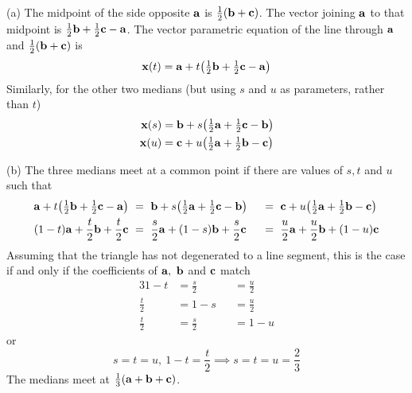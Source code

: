 \begin{solution}
(a) The midpoint of the side opposite $\mathbf{a}$ is
$\tfrac{1}{2}(\mathbf{b}+\mathbf{c})$. The vector joining $\mathbf{a}$ to that midpoint
is $\tfrac{1}{2}\mathbf{b}+\tfrac{1}{2}\mathbf{c}-\mathbf{a}$. The vector parametric equation
of the line through $\mathbf{a}$ and $\tfrac{1}{2}(\mathbf{b}+\mathbf{c})$ is
\begin{equation*}
\mathbf{x}(t)=\mathbf{a}+t\big(\tfrac{1}{2}\mathbf{b}+\tfrac{1}{2}\mathbf{c}-\mathbf{a}\big)
\end{equation*}
Similarly, for the other two medians (but using $s$ and $u$ as
parameters, rather than $t$)
\begin{align*}
\mathbf{x}(s)&=\mathbf{b}+s\big(\tfrac{1}{2}\mathbf{a}+\tfrac{1}{2}\mathbf{c}-\mathbf{b}\big)\\
\mathbf{x}(u)&=\mathbf{c}+u\big(\tfrac{1}{2}\mathbf{a}+\tfrac{1}{2}\mathbf{b}-\mathbf{c}\big)
\end{align*}

(b) The three medians meet at a common point if there are
values of $s,t$ and $u$ such that
\begin{alignat*}{3}
\mathbf{a}+t\big(\tfrac{1}{2}\mathbf{b}+\tfrac{1}{2}\mathbf{c}-\mathbf{a}\big)
&\ =\ \mathbf{b}+s\big(\tfrac{1}{2}\mathbf{a}+\tfrac{1}{2}\mathbf{c}-\mathbf{b}\big)
&&\ =\ \mathbf{c}+u\big(\tfrac{1}{2}\mathbf{a}+\tfrac{1}{2}\mathbf{b}-\mathbf{c}\big)\\
(1-t)\mathbf{a}+\frac{t}{2}\mathbf{b}+\frac{t}{2}\mathbf{c}
&\ =\ \frac{s}{2}\mathbf{a}+(1-s)\mathbf{b}+\frac{s}{2}\mathbf{c}
&&\ =\ \frac{u}{2}\mathbf{a}+\frac{u}{2}\mathbf{b}+(1-u)\mathbf{c}
\end{alignat*}
Assuming that the triangle has not degenerated to a line segment,
this is the case if and only if the coefficients of $\mathbf{a},\ \mathbf{b}$ 
and $\mathbf{c}$ match
\begin{alignat*}{3}
1-t&=\frac{s}{2}&&=\frac{u}{2}\\
\frac{t}{2}&=1-s&&=\frac{u}{2}\\
\frac{t}{2}&=\frac{s}{2}&&=1-u
\end{alignat*}
or
\begin{equation*}
s=t=u,\  1-t=\frac{t}{2}
\implies
s=t=u=\frac{2}{3}
\end{equation*}
The medians meet at $\frac{1}{3}(\mathbf{a}+\mathbf{b}+\mathbf{c})$.
\end{solution}


